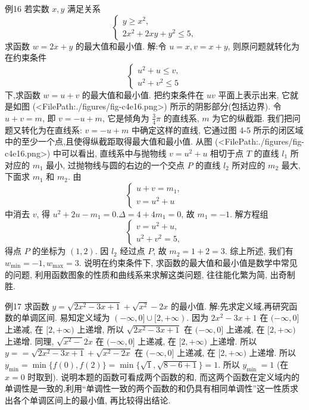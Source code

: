 例16 若实数 $x, y$ 满足关系
$$
\left\{\begin{array}{l}
y \geqslant x^2, \\
2 x^2+2 x y+y^2 \leqslant 5,
\end{array}\right.
$$
求函数 $w=2 x+y$ 的最大值和最小值.
解:令 $u=x, v=x+y$, 则原问题就转化为在约束条件
$$
\left\{\begin{array}{l}
u^2+u \leqslant v, \\
u^2+v^2 \leqslant 5
\end{array}\right.
$$
下,求函数 $w=u+v$ 的最大值和最小值.
把约束条件在 $u v$ 平面上表示出来, 它就是如图 (<FilePath:./figures/fig-c4e16.png>) 所示的阴影部分(包括边界).
令 $u+v=m$, 即 $v=-u+m$, 它是倾角为 $\frac{3}{4} \pi$ 的直线系, $m$ 为它的纵截距.
我们把问题又转化为在直线系: $v=-u+m$ 中确定这样的直线, 它通过图 4-5 所示的闭区域中的至少一个点,且使得纵截距取得最大值和最小值.
从图 (<FilePath:./figures/fig-c4e16.png>) 中可以看出, 直线系中与抛物线 $v= u^2+u$ 相切于点 $T$ 的直线 $l_1$ 所对应的 $m_1$ 最小, 过抛物线与圆的右边的一个交点 $P$ 的直线 $l_2$ 所对应的 $m_2$ 最大,下面求 $m_1$ 和 $m_2$. 由
$$
\left\{\begin{array}{l}
u+v=m_1, \\
v=u^2+u
\end{array}\right.
$$
中消去 $v$, 得 $u^2+2 u-m_1=0 . \Delta=4+4 m_1=0$, 故 $m_1=-1$.
解方程组
$$
\left\{\begin{array}{l}
v=u^2+u, \\
u^2+v^2=5,
\end{array}\right.
$$
得点 $P$ 的坐标为 $(1,2)$. 因 $l_2$ 经过点 $P$, 故 $m_2=1+2=3$.
综上所述, 我们有 $w_{\min }=-1, w_{\max }=3$.
说明在约束条件下, 求函数的最大值和最小值是数学中常见的问题, 利用函数图象的性质和曲线系来求解这类问题, 往往能化繁为简, 出奇制胜.



例17 求函数 $y=\sqrt{2 x^2-3 x+1}+\sqrt{x^2}-2 x$ 的最小值.
解:先求定义域,再研究函数的单调区间.
易知定义域为 $(-\infty, 0] \cup[2,+\infty)$.
因为 $2 x^2-3 x+1$ 在 $(-\infty, 0]$ 上递减, 在 $[2,+\infty)$ 上递增, 所以 $\sqrt{2 x^2-3 x+1}$ 在 $(-\infty, 0]$ 上递减, 在 $[2,+\infty)$ 上递增.
同理, $\sqrt{x^2-} \overline{2 x}$ 在 $(-\infty, 0]$ 上递减, 在 $[2,+\infty)$ 上递增.
所以 $y==\sqrt{2 x^2-3 x+1}+\sqrt{x^2-2 x}$ 在 $(-\infty, 0]$ 上递减, 在 $[2,+\infty)$ 上递增.
所以 $y_{\min }=\min \{f(0), f(2)\}=\min \{\sqrt{1}, \sqrt{8-6+1}\}=1$.
所以 $y_{\text {min }}=1$ (在 $x=0$ 时取到).
说明本题的函数可看成两个函数的和, 而这两个函数在定义域内的单调性是一致的,利用“单调性一致的两个函数的和仍具有相同单调性”这一性质求出各个单调区间上的最小值, 再比较得出结论.



